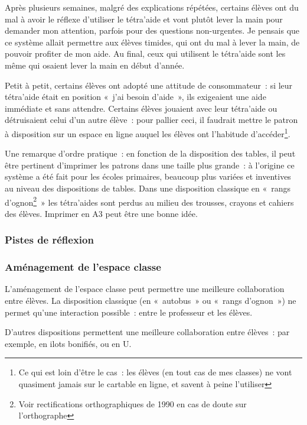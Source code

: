 Après plusieurs semaines, malgré des explications répétées, certains élèves ont du mal à avoir le réflexe
d'utiliser le tétra'aide et vont plutôt lever la main pour demander mon attention,
parfois pour des questions non-urgentes. Je pensais que ce système allait permettre
aux élèves timides, qui ont du mal à lever la main, de pouvoir profiter de mon aide.
Au final, ceux qui utilisent le tétra'aide sont les même qui osaient lever la main
en début d'année.

Petit à petit, certains élèves ont adopté une attitude de consommateur : si
leur tétra'aide était en position « j'ai besoin d'aide », ils exigeaient une
aide immédiate et sans attendre. Certains élèves jouaient avec leur tétra'aide ou
détruisaient celui d'un autre élève : pour pallier ceci, il faudrait mettre
le patron à disposition sur un espace en ligne auquel les élèves ont l'habitude
d'accéder\footnote{Ce qui est loin d'être le cas : les élèves (en tout cas de mes
classes) ne vont quasiment jamais sur le cartable en ligne, et savent à peine
l'utiliser}.

Une remarque d'ordre pratique : en fonction de la disposition des tables, il
peut être pertinent d'imprimer les patrons dans une taille plus grande : à
l'origine ce système a été fait pour les écoles primaires, beaucoup plus variées
et inventives au niveau des dispositions de tables. Dans une disposition classique
en « rangs d'ognon\footnote{Voir rectifications orthographiques de 1990 en cas de doute
sur l'orthographe} » les tétra'aides sont perdus au milieu des trousses, crayons
et cahiers des élèves. Imprimer en A3 peut être une bonne idée.

\subsubsection{Pistes de réflexion}

\subsubsection{Aménagement de l'espace classe}

L'aménagement de l'espace classe peut permettre une meilleure collaboration entre
élèves. La disposition classique (en « autobus » ou « rangs d'ognon ») ne permet
qu'une interaction possible : entre le professeur et les élèves.

D'autres dispositions permettent une meilleure collaboration entre élèves : par
exemple, en ilots bonifiés\cite{ilots_bonifies}, ou en U\cite{amenagement_classe}.

